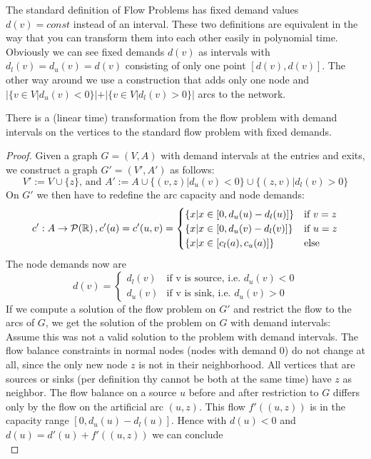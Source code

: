 The standard definition of Flow Problems has fixed demand values $d(v)=const$ instead of an interval. These two 
definitions are equivalent in the way that you can transform them into each other easily in polynomial time. Obviously 
we can see fixed demands $d(v)$ as intervals with $d_l(v)=d_u(v)=d(v)$ consisting of only one point $[d(v), d(v)]$. The 
other way around we use a construction that adds only one node and $|\{v\in V| d_u(v)<0\}|+|\{v\in V| d_l(v)>0\}|$ arcs 
to the network.
\begin{prop}
 There is a (linear time) transformation from the flow problem with demand intervals on the vertices to the standard 
flow problem with fixed demands. 
\end{prop}
\begin{proof}
 Given a graph $G=(V,A)$ with demand intervals at the entries and exits, we construct a graph $G'=(V',A')$ as follows:
 $$V' := V\cup \{z\} \textrm{, and } A' := A\cup \{ (v,z)| d_u(v)<0 \}\cup\{ (z,v)|d_l(v)>0\}$$ On $G'$ we then have 
to redefine the arc capacity and node demands: 
$$c':A\to \mathcal{P}(\mathbb{R})  \,, c'(a)= c'(u,v) = \begin{cases} \{x|x\in [0,d_u(u)-d_l(u)]\} &\textrm{if }v=z\\ 
\{x|x\in [0,d_u(v)-d_l(v)]\}&\textrm{if }u=z\\ \{x|x\in[c_l(a), c_u(a)]\} &\textrm{else } \end{cases}
$$ 
The node demands now are 
$$ d(v)=\begin{cases} d_l(v) & \textrm{if v is source, i.e. }d_u(v)<0\\
         d_u(v) &\textrm{if v is sink, i.e. }d_u(v)>0
        \end{cases}
$$
If we compute a solution of the flow problem on $G'$ and restrict the flow to the arcs of $G$, we get the solution of 
the problem on $G$ with demand intervals:\\ 
Assume this was not a valid solution to the problem with demand intervals. The flow balance constraints in normal nodes 
(nodes with demand 0) do not change at all, since the only new node $z$ is not in their neighborhood. All vertices that 
are sources or sinks (per definition thy cannot be both at the same time) have $z$ as neighbor. The flow balance on a 
source $u$ before and after restriction to $G$ differs only by the flow on the artificial arc $(u,z)$. This flow 
$f'((u,z))$ is in the capacity range $[0,d_u(u)-d_l(u)]$. Hence with $d(u)<0$ and $ d(u)=d'(u)+f'((u,z))$ we can 
conclude $$ $$
\end{proof}



